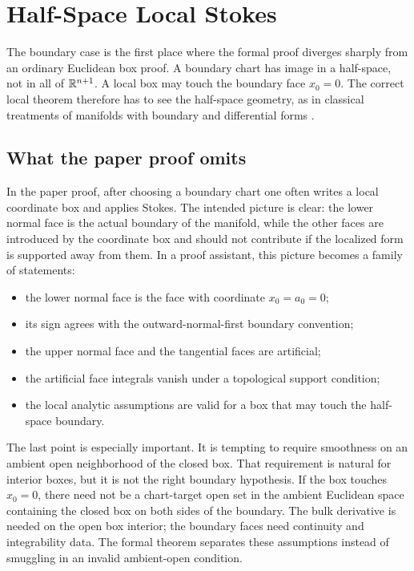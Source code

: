\section{Half-Space Local Stokes}
\label{sec:halfspace}

The boundary case is the first place where the formal proof diverges sharply
from an ordinary Euclidean box proof.  A boundary chart has image in a
half-space, not in all of \(\mathbb{R}^{n+1}\).  A local box may touch the boundary
face \(x_0=0\).  The correct local theorem therefore has to see the half-space
geometry, as in classical treatments of manifolds with boundary and
differential forms
\cite{warner1983foundations,abraham1988manifolds,lang1995differential,lee2013smooth}.

\subsection{What the paper proof omits}

In the paper proof, after choosing a boundary chart one often writes a local
coordinate box and applies Stokes.  The intended picture is clear: the lower
normal face is the actual boundary of the manifold, while the other faces are
introduced by the coordinate box and should not contribute if the localized
form is supported away from them.  In a proof assistant, this picture becomes
a family of statements:
\begin{itemize}
  \item the lower normal face is the face with coordinate \(x_0=a_0=0\);
  \item its sign agrees with the outward-normal-first boundary convention;
  \item the upper normal face and the tangential faces are artificial;
  \item the artificial face integrals vanish under a topological support
  condition;
  \item the local analytic assumptions are valid for a box that may touch the
  half-space boundary.
\end{itemize}

The last point is especially important.  It is tempting to require smoothness
on an ambient open neighborhood of the closed box.  That requirement is
natural for interior boxes, but it is not the right boundary hypothesis.  If
the box touches \(x_0=0\), there need not be a chart-target open set in the
ambient Euclidean space containing the closed box on both sides of the
boundary.  The bulk derivative is needed on the open box interior; the boundary
faces need continuity and integrability data.  The formal theorem separates
these assumptions instead of smuggling in an invalid ambient-open condition.

